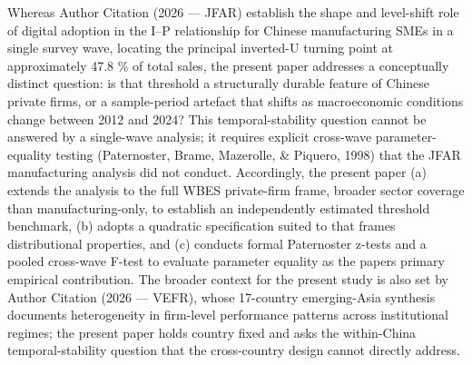 \documentclass[12pt,a4paper]{article}
\begin{document}
Whereas Author Citation (2026 --- JFAR) establish the shape and
level-shift role of digital adoption in the I--P relationship for
Chinese manufacturing SMEs in a single survey wave, locating the
principal inverted-U turning point at approximately 47.8 \% of total
sales, the present paper addresses a conceptually distinct question: is
that threshold a structurally durable feature of Chinese private firms,
or a sample-period artefact that shifts as macroeconomic conditions
change between 2012 and 2024? This temporal-stability question cannot be
answered by a single-wave analysis; it requires explicit cross-wave
parameter-equality testing (Paternoster, Brame, Mazerolle, \& Piquero,
1998) that the JFAR manufacturing analysis did not conduct. Accordingly,
the present paper (a) extends the analysis to the full WBES private-firm
frame, broader sector coverage than manufacturing-only, to establish an
independently estimated threshold benchmark, (b) adopts a quadratic
specification suited to that frame\textquotesingle s distributional
properties, and (c) conducts formal Paternoster z-tests and a pooled
cross-wave F-test to evaluate parameter equality as the
paper\textquotesingle s primary empirical contribution. The broader
context for the present study is also set by Author Citation (2026 ---
VEFR), whose 17-country emerging-Asia synthesis documents heterogeneity
in firm-level performance patterns across institutional regimes; the
present paper holds country fixed and asks the within-China
temporal-stability question that the cross-country design cannot
directly address.
\end{document}
